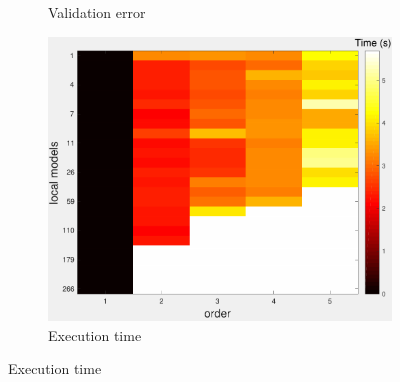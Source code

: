 \documentclass[letterpaper, 10 pt, conference]{ieeeconf}  %
\begin{document}
\begin{figure}[thpb]
\begin{subfigure}[b]{1in}
                \caption{Validation error}
                \label{fig:crossval_train}
        \end{subfigure}
                \begin{subfigure}[b]{1in} 
                \centering
                \includegraphics[width=\textwidth]{figures/cross_allreg3.pdf}
                \caption{Execution time}
                \label{fig:crossval_train}
        \end{subfigure}
\end{figure}
\end{document}
